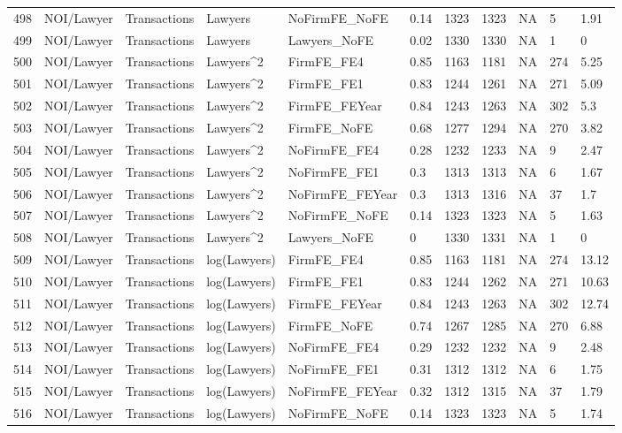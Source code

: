 \documentclass{article}
\begin{document}
\begin{table}[H]
\begin{tabular}{rllllllllll}
  498 & NOI/Lawyer & Transactions & Lawyers & NoFirmFE\_NoFE & 0.14 & 1323 & 1323 & NA & 5 & 1.91 \\ 
  499 & NOI/Lawyer & Transactions & Lawyers & Lawyers\_NoFE & 0.02 & 1330 & 1330 & NA & 1 & 0 \\ 
  500 & NOI/Lawyer & Transactions & Lawyers^2 & FirmFE\_FE4 & 0.85 & 1163 & 1181 & NA & 274 & 5.25 \\ 
  501 & NOI/Lawyer & Transactions & Lawyers^2 & FirmFE\_FE1 & 0.83 & 1244 & 1261 & NA & 271 & 5.09 \\ 
  502 & NOI/Lawyer & Transactions & Lawyers^2 & FirmFE\_FEYear & 0.84 & 1243 & 1263 & NA & 302 & 5.3 \\ 
  503 & NOI/Lawyer & Transactions & Lawyers^2 & FirmFE\_NoFE & 0.68 & 1277 & 1294 & NA & 270 & 3.82 \\ 
  504 & NOI/Lawyer & Transactions & Lawyers^2 & NoFirmFE\_FE4 & 0.28 & 1232 & 1233 & NA & 9 & 2.47 \\ 
  505 & NOI/Lawyer & Transactions & Lawyers^2 & NoFirmFE\_FE1 & 0.3 & 1313 & 1313 & NA & 6 & 1.67 \\ 
  506 & NOI/Lawyer & Transactions & Lawyers^2 & NoFirmFE\_FEYear & 0.3 & 1313 & 1316 & NA & 37 & 1.7 \\ 
  507 & NOI/Lawyer & Transactions & Lawyers^2 & NoFirmFE\_NoFE & 0.14 & 1323 & 1323 & NA & 5 & 1.63 \\ 
  508 & NOI/Lawyer & Transactions & Lawyers^2 & Lawyers\_NoFE & 0 & 1330 & 1331 & NA & 1 & 0 \\ 
  509 & NOI/Lawyer & Transactions & log(Lawyers) & FirmFE\_FE4 & 0.85 & 1163 & 1181 & NA & 274 & 13.12 \\ 
  510 & NOI/Lawyer & Transactions & log(Lawyers) & FirmFE\_FE1 & 0.83 & 1244 & 1262 & NA & 271 & 10.63 \\ 
  511 & NOI/Lawyer & Transactions & log(Lawyers) & FirmFE\_FEYear & 0.84 & 1243 & 1263 & NA & 302 & 12.74 \\ 
  512 & NOI/Lawyer & Transactions & log(Lawyers) & FirmFE\_NoFE & 0.74 & 1267 & 1285 & NA & 270 & 6.88 \\ 
  513 & NOI/Lawyer & Transactions & log(Lawyers) & NoFirmFE\_FE4 & 0.29 & 1232 & 1232 & NA & 9 & 2.48 \\ 
  514 & NOI/Lawyer & Transactions & log(Lawyers) & NoFirmFE\_FE1 & 0.31 & 1312 & 1312 & NA & 6 & 1.75 \\ 
  515 & NOI/Lawyer & Transactions & log(Lawyers) & NoFirmFE\_FEYear & 0.32 & 1312 & 1315 & NA & 37 & 1.79 \\ 
  516 & NOI/Lawyer & Transactions & log(Lawyers) & NoFirmFE\_NoFE & 0.14 & 1323 & 1323 & NA & 5 & 1.74 \\ 

\end{tabular}
\end{table}
\end{document}
